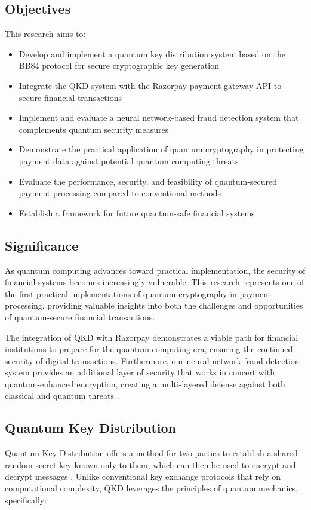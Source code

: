 \documentclass[onecolumn,a4paper,10pt]{IEEEtran}
\begin{document}
\subsection{Objectives}
This research aims to:
\begin{itemize}
    \item Develop and implement a quantum key distribution system based on the BB84 protocol for secure cryptographic key generation
    \item Integrate the QKD system with the Razorpay payment gateway API to secure financial transactions
    \item Implement and evaluate a neural network-based fraud detection system that complements quantum security measures
    \item Demonstrate the practical application of quantum cryptography in protecting payment data against potential quantum computing threats
    \item Evaluate the performance, security, and feasibility of quantum-secured payment processing compared to conventional methods
    \item Establish a framework for future quantum-safe financial systems
\end{itemize}

\subsection{Significance}
As quantum computing advances toward practical implementation, the security of financial systems becomes increasingly vulnerable. This research represents one of the first practical implementations of quantum cryptography in payment processing, providing valuable insights into both the challenges and opportunities of quantum-secure financial transactions.

The integration of QKD with Razorpay demonstrates a viable path for financial institutions to prepare for the quantum computing era, ensuring the continued security of digital transactions. Furthermore, our neural network fraud detection system provides an additional layer of security that works in concert with quantum-enhanced encryption, creating a multi-layered defense against both classical and quantum threats \cite{payment_security}.

\subsection{Quantum Key Distribution}
Quantum Key Distribution offers a method for two parties to establish a shared random secret key known only to them, which can then be used to encrypt and decrypt messages \cite{qkd_review}. Unlike conventional key exchange protocols that rely on computational complexity, QKD leverages the principles of quantum mechanics, specifically:
\end{document}
